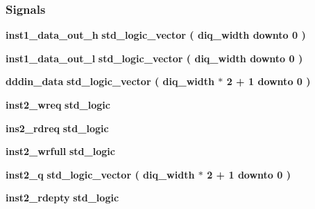 \subsubsection*{Signals}
 \begin{DoxyCompactItemize}
\item 
{\bf inst1\+\_\+data\+\_\+out\+\_\+h} {\bfseries \textcolor{comment}{std\+\_\+logic\+\_\+vector}\textcolor{vhdlchar}{ }\textcolor{vhdlchar}{(}\textcolor{vhdlchar}{ }\textcolor{vhdlchar}{ }\textcolor{vhdlchar}{ }\textcolor{vhdlchar}{ }{\bfseries {\bf diq\+\_\+width}} \textcolor{vhdlchar}{ }\textcolor{keywordflow}{downto}\textcolor{vhdlchar}{ }\textcolor{vhdlchar}{ } \textcolor{vhdldigit}{0} \textcolor{vhdlchar}{ }\textcolor{vhdlchar}{)}\textcolor{vhdlchar}{ }} 
\item 
{\bf inst1\+\_\+data\+\_\+out\+\_\+l} {\bfseries \textcolor{comment}{std\+\_\+logic\+\_\+vector}\textcolor{vhdlchar}{ }\textcolor{vhdlchar}{(}\textcolor{vhdlchar}{ }\textcolor{vhdlchar}{ }\textcolor{vhdlchar}{ }\textcolor{vhdlchar}{ }{\bfseries {\bf diq\+\_\+width}} \textcolor{vhdlchar}{ }\textcolor{keywordflow}{downto}\textcolor{vhdlchar}{ }\textcolor{vhdlchar}{ } \textcolor{vhdldigit}{0} \textcolor{vhdlchar}{ }\textcolor{vhdlchar}{)}\textcolor{vhdlchar}{ }} 
\item 
{\bf dddin\+\_\+data} {\bfseries \textcolor{comment}{std\+\_\+logic\+\_\+vector}\textcolor{vhdlchar}{ }\textcolor{vhdlchar}{(}\textcolor{vhdlchar}{ }\textcolor{vhdlchar}{ }\textcolor{vhdlchar}{ }\textcolor{vhdlchar}{ }{\bfseries {\bf diq\+\_\+width}} \textcolor{vhdlchar}{$\ast$}\textcolor{vhdlchar}{ } \textcolor{vhdldigit}{2} \textcolor{vhdlchar}{+}\textcolor{vhdlchar}{ } \textcolor{vhdldigit}{1} \textcolor{vhdlchar}{ }\textcolor{keywordflow}{downto}\textcolor{vhdlchar}{ }\textcolor{vhdlchar}{ } \textcolor{vhdldigit}{0} \textcolor{vhdlchar}{ }\textcolor{vhdlchar}{)}\textcolor{vhdlchar}{ }} 
\item 
{\bf inst2\+\_\+wreq} {\bfseries \textcolor{comment}{std\+\_\+logic}\textcolor{vhdlchar}{ }} 
\item 
{\bf ins2\+\_\+rdreq} {\bfseries \textcolor{comment}{std\+\_\+logic}\textcolor{vhdlchar}{ }} 
\item 
{\bf inst2\+\_\+wrfull} {\bfseries \textcolor{comment}{std\+\_\+logic}\textcolor{vhdlchar}{ }} 
\item 
{\bf inst2\+\_\+q} {\bfseries \textcolor{comment}{std\+\_\+logic\+\_\+vector}\textcolor{vhdlchar}{ }\textcolor{vhdlchar}{(}\textcolor{vhdlchar}{ }\textcolor{vhdlchar}{ }\textcolor{vhdlchar}{ }\textcolor{vhdlchar}{ }{\bfseries {\bf diq\+\_\+width}} \textcolor{vhdlchar}{$\ast$}\textcolor{vhdlchar}{ } \textcolor{vhdldigit}{2} \textcolor{vhdlchar}{+}\textcolor{vhdlchar}{ } \textcolor{vhdldigit}{1} \textcolor{vhdlchar}{ }\textcolor{keywordflow}{downto}\textcolor{vhdlchar}{ }\textcolor{vhdlchar}{ } \textcolor{vhdldigit}{0} \textcolor{vhdlchar}{ }\textcolor{vhdlchar}{)}\textcolor{vhdlchar}{ }} 
\item 
{\bf inst2\+\_\+rdepty} {\bfseries \textcolor{comment}{std\+\_\+logic}\textcolor{vhdlchar}{ }} 
\end{DoxyCompactItemize}
